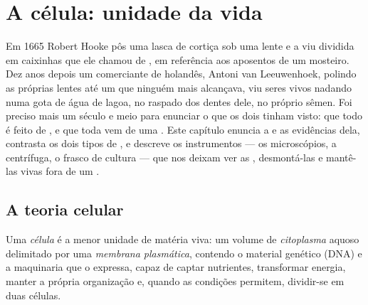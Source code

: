 \chapter{A célula: unidade da vida}\label{ch:b1:cell-unit-of-life}

Em 1665 Robert Hooke pôs uma lasca de cortiça sob uma lente e a viu
dividida em caixinhas que ele chamou de , em referência aos
aposentos de um mosteiro. Dez anos depois um comerciante de 
holandês, Antoni van Leeuwenhoek, polindo as próprias lentes até um
 que ninguém mais alcançava, viu seres vivos nadando numa gota de
água de lagoa, no raspado dos dentes dele, no próprio sêmen. Foi preciso
mais um século e meio para enunciar o que os dois tinham visto: que todo
 é feito de , e que toda  vem de uma . Este
capítulo enuncia a  e as evidências dela, contrasta os dois
tipos de , e descreve os instrumentos --- os microscópios, a
centrífuga, o frasco de cultura --- que nos deixam ver as ,
desmontá-las e mantê-las vivas fora de um .

\section{A teoria celular}

\begin{definition}[Célula]\label{def:b1:cell-unit-of-life:cell}
Uma \emph{célula} é a menor unidade de matéria viva: um
volume de \emph{citoplasma} aquoso delimitado por uma
\emph{membrana plasmática}, contendo o
material genético (DNA) e a maquinaria que o expressa, capaz de captar
nutrientes, transformar energia, manter a própria organização e, quando
as condições permitem, dividir-se em duas células.
\end{definition}

